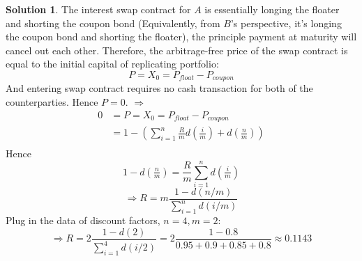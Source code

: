 \documentclass[a4paper, 10pt]{article}
\theoremstyle{definition}
\theoremstyle{hSol}
\newtheorem*{solution}{Solution}
\begin{document}
\begin{solution}
The interest swap contract for $A$ is essentially longing the floater and shorting the coupon bond (Equivalently, from $B$'s perspective, it's longing the coupon bond and shorting the floater), the principle payment at maturity will cancel out each other. Therefore, the arbitrage-free price of the swap contract is equal to the initial capital of replicating portfolio:
$$
P = X_0 = P_{float} - P_{coupon} 
$$ 
And entering swap contract requires no cash transaction for both of the counterparties. Hence $P=0$. $\Rightarrow$
\begin{equation}
  \begin{split}
    0 &= P = X_0 = P_{float} - P_{coupon} \\
    &= 1 - \left(\sum_{i=1}^n \frac{R}{m} d(\tfrac{i}{m}) + d(\tfrac{n}{m})\right)\\
  \end{split}
\end{equation}
Hence
\begin{equation}
  1 - d(\tfrac{n}{m}) = \frac{R}{m}\sum_{i=1}^n  d(\tfrac{i}{m})
\end{equation}
$$
\Rightarrow R = m\frac{1 - d(n/m)}{\sum_{i=1}^n  d(i/m)}
$$
Plug in the data of discount factors, $n=4, m=2$:
$$
\Rightarrow R = 2\frac{1 - d(2)}{\sum_{i=1}^4  d(i/2)} = 2\frac{1 - 0.8}{0.95+ 0.9 + 0.85 + 0.8} \approx 0.1143
$$
\end{solution}
\end{document}
